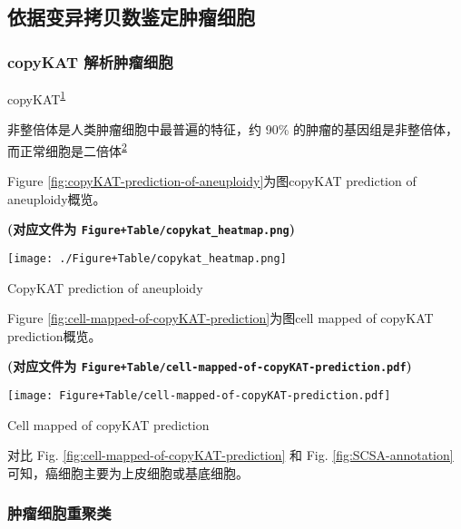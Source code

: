 \documentclass[
]{article}
\begin{document}
\hypertarget{ux4f9dux636eux53d8ux5f02ux62f7ux8d1dux6570ux9274ux5b9aux80bfux7624ux7ec6ux80de}{%
\subsection{依据变异拷贝数鉴定肿瘤细胞}\label{ux4f9dux636eux53d8ux5f02ux62f7ux8d1dux6570ux9274ux5b9aux80bfux7624ux7ec6ux80de}}

\hypertarget{copykat-ux89e3ux6790ux80bfux7624ux7ec6ux80de}{%
\subsubsection{copyKAT 解析肿瘤细胞}\label{copykat-ux89e3ux6790ux80bfux7624ux7ec6ux80de}}

copyKAT\textsuperscript{\protect\hyperlink{ref-DelineatingCopGaoR2021}{1}}

非整倍体是人类肿瘤细胞中最普遍的特征，约 90\% 的肿瘤的基因组是非整倍体，而正常细胞是二倍体\textsuperscript{\protect\hyperlink{ref-CausesAndConsGordon2012}{2}}

Figure \ref{fig:copyKAT-prediction-of-aneuploidy}为图copyKAT prediction of aneuploidy概览。

\textbf{(对应文件为 \texttt{Figure+Table/copykat\_heatmap.png})}

\def\@captype{figure}
\begin{center}
\texttt{[image: ./Figure+Table/copykat\_heatmap.png]}
\caption{CopyKAT prediction of aneuploidy}\label{fig:copyKAT-prediction-of-aneuploidy}
\end{center}

Figure \ref{fig:cell-mapped-of-copyKAT-prediction}为图cell mapped of copyKAT prediction概览。

\textbf{(对应文件为 \texttt{Figure+Table/cell-mapped-of-copyKAT-prediction.pdf})}

\def\@captype{figure}
\begin{center}
\texttt{[image: Figure+Table/cell-mapped-of-copyKAT-prediction.pdf]}
\caption{Cell mapped of copyKAT prediction}\label{fig:cell-mapped-of-copyKAT-prediction}
\end{center}

对比 Fig. \ref{fig:cell-mapped-of-copyKAT-prediction} 和 Fig. \ref{fig:SCSA-annotation} 可知，癌细胞主要为上皮细胞或基底细胞。

\hypertarget{ux80bfux7624ux7ec6ux80deux91cdux805aux7c7b}{%
\subsubsection{肿瘤细胞重聚类}\label{ux80bfux7624ux7ec6ux80deux91cdux805aux7c7b}}
\end{document}
